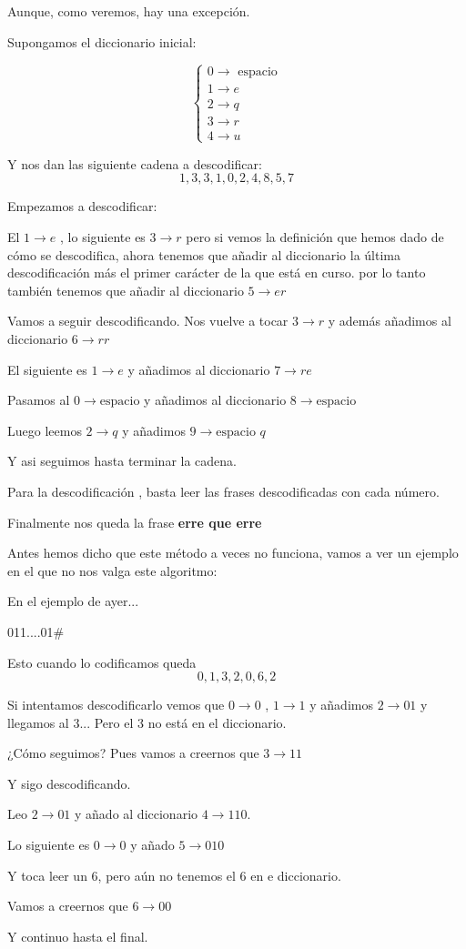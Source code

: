 Aunque, como veremos, hay una excepción.

\begin{example}
	Supongamos el diccionario inicial:

	$$\begin{cases}
	0 \rightarrow \text{ espacio}\\
	1 \rightarrow e\\
	2 \rightarrow q\\
	3 \rightarrow r\\
	4 \rightarrow u
	\end{cases}$$

	Y nos dan las siguiente cadena a descodificar:
	$$1,3,3,1,0,2,4,8,5,7$$

	Empezamos a descodificar:

	El $1 \rightarrow e$ , lo siguiente es $3 \rightarrow r$ pero si vemos la definición que hemos dado de cómo se descodifica, ahora tenemos que añadir al diccionario la última descodificación más el primer carácter de la que está en curso. por lo tanto también tenemos que añadir al diccionario $5\rightarrow er$

	Vamos a seguir descodificando. Nos vuelve a tocar $3 \rightarrow r$ y además añadimos al diccionario $6 \rightarrow rr$

	El siguiente es $1 \rightarrow e$ y añadimos al diccionario $7 \rightarrow re$

	Pasamos al $0 \rightarrow \text{espacio}$ y añadimos al diccionario $8 \rightarrow \text{espacio}$

	Luego leemos $2 \rightarrow q$ y añadimos $9 \rightarrow \text{espacio } q$

	Y asi seguimos hasta terminar la cadena.

	Para la descodificación , basta leer las frases descodificadas con cada número.

	Finalmente nos queda la frase \textbf{erre que erre}
\end{example}

Antes hemos dicho que este método a veces no funciona, vamos a ver un ejemplo en el que no nos valga este algoritmo:

\begin{example}
	En el ejemplo de ayer...

	011....01\#

	Esto cuando lo codificamos queda
	$$0,1,3,2,0,6,2$$

	Si intentamos descodificarlo vemos que $0 \rightarrow 0$ , $1 \rightarrow 1$ y añadimos $2 \rightarrow 01$ y llegamos al 3... Pero el 3 no está en el diccionario.

	¿Cómo seguimos? Pues vamos a creernos que $3 \rightarrow 11$

	Y sigo descodificando.

	Leo $2 \rightarrow 01$ y añado al diccionario $4 \rightarrow 110$.

	Lo siguiente es $0 \rightarrow 0$ y añado $5 \rightarrow 010$

	Y toca leer un 6, pero aún no tenemos el 6 en e diccionario.

	Vamos a creernos que $6 \rightarrow 00$

	Y continuo hasta el final.
\end{example}

